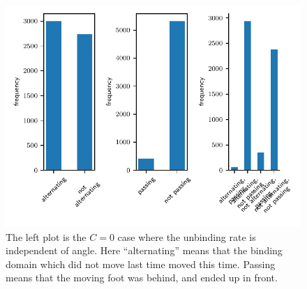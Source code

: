 \documentclass[9pt,twocolumn,twoside]{pnas-new}
\begin{document}
\begin{figure}[tbhp]
    \includegraphics[width=0.5\linewidth]{../../plots/paper_foot_order_histogram.pdf}
\caption{The left plot is the $C=0$ case where the unbinding rate is
  independent of angle.  Here ``alternating'' means that the binding
  domain which did not move last time moved this time.  Passing means
  that the moving foot was behind, and ended up in front.}
\label{fig:steppingorder}
\end{figure}



\end{document}
